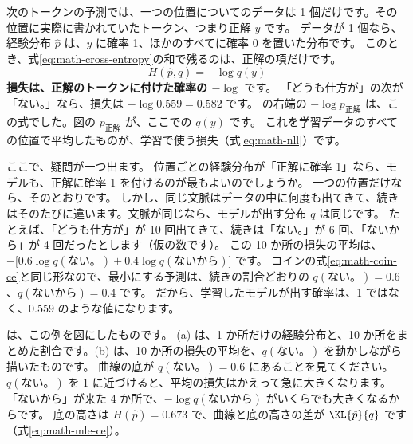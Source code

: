 次のトークンの予測では、一つの位置についてのデータは 1 個だけです。その位置に実際に書かれていたトークン、つまり正解 $y$ です。
データが 1 個なら、経験分布 $\hat p$ は、$y$ に確率 1、ほかのすべてに確率 0 を置いた分布です。
このとき、式\eqref{eq:math-cross-entropy}の和で残るのは、正解の項だけです。
\begin{equation}
H(\hat p,q)=-\log q(y)
\label{eq:math-ce-onehot}
\end{equation}
\textbf{損失は、正解のトークンに付けた確率の $-\log$} です。
「どうも仕方が」の次が「ない。」なら、損失は $-\log 0.559=0.582$ です。
の右端の $-\log p_{\text{正解}}$ は、この式でした。図の $p_{\text{正解}}$ が、ここでの $q(y)$ です。
これを学習データのすべての位置で平均したものが、学習で使う損失（式\eqref{eq:math-nll}）です。

ここで、疑問が一つ出ます。
位置ごとの経験分布が「正解に確率 1」なら、モデルも、正解に確率 1 を付けるのが最もよいのでしょうか。
一つの位置だけなら、そのとおりです。
しかし、同じ文脈はデータの中に何度も出てきて、続きはそのたびに違います。文脈が同じなら、モデルが出す分布 $q$ は同じです。
たとえば、「どうも仕方が」が 10 回出てきて、続きは「ない。」が 6 回、「ないから」が 4 回だったとします（仮の数です）。
この 10 か所の損失の平均は、$-\bigl[0.6\log q(\text{ない。})+0.4\log q(\text{ないから})\bigr]$ です。
コインの式\eqref{eq:math-coin-ce}と同じ形なので、最小にする予測は、続きの割合どおりの $q(\text{ない。})=0.6$、$q(\text{ないから})=0.4$ です。
だから、学習したモデルが出す確率は、1 ではなく、0.559 のような値になります。

は、この例を図にしたものです。
(a) は、1 か所だけの経験分布と、10 か所をまとめた割合です。(b) は、10 か所の損失の平均を、$q(\text{ない。})$ を動かしながら描いたものです。
曲線の底が $q(\text{ない。})=0.6$ にあることを見てください。
$q(\text{ない。})$ を 1 に近づけると、平均の損失はかえって急に大きくなります。「ないから」が来た 4 か所で、$-\log q(\text{ないから})$ がいくらでも大きくなるからです。
底の高さは $H(\hat p)=0.673$ で、曲線と底の高さの差が $\KL{\hat p}{q}$ です（式\eqref{eq:math-mle-ce}）。

